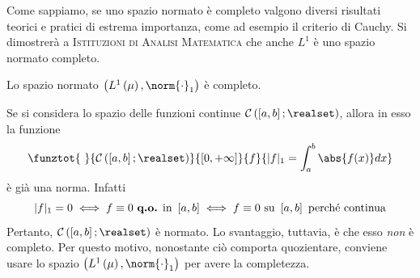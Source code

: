 Come sappiamo, se uno spazio normato è completo valgono diversi risultati teorici e pratici di estrema importanza, come ad esempio il criterio di Cauchy. Si dimostrerà a \textsc{Istituzioni di Analisi Matematica} che anche $L^1$ è uno spazio normato completo.
\begin{theoremaqed}[{$L^1$} è completo]
	Lo spazio normato $\left(L^1\left(\mu\right),\norm{\cdot}_1\right)$ è completo.
\end{theoremaqed}
\begin{observe}
	Se si considera lo spazio delle funzioni continue $\mathcal{C}\left(\left[a,b\right];\realset\right)$, allora in esso la funzione
	\begin{equation*}
		\funztot{\ }{\mathcal{C}\left(\left[a,b\right];\realset\right)}{\left[0,+\infty\right]}{f}{\lvert f\rvert_1=\int_{a}^{b}\abs{f(x)}dx}
	\end{equation*}
	è già una norma. Infatti
	\begin{equation*}
		\lvert f\rvert_1 = 0 \iff f\equiv 0\text{ \textbf{q.o.} in }\left[a,b\right]\iff f\equiv 0\text{ su }\left[a,b\right]\text{ perché continua}
	\end{equation*}
	Pertanto, $\mathcal{C}\left(\left[a,b\right];\realset\right)$ è normato. Lo svantaggio, tuttavia, è che esso \textit{non} è completo. Per questo motivo, nonostante ciò comporta quozientare, conviene usare lo spazio $\left(L^1\left(\mu\right),\norm{\cdot}_1\right)$ per avere la completezza.
\end{observe}
